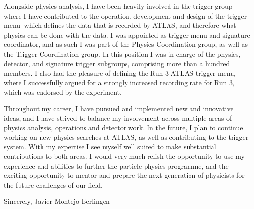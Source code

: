 \documentclass[11pt,a4paper,sans]{moderncv}        %
\begin{document}


Alongside physics analysis, I have been heavily involved in the trigger group where I have contributed to the operation, development and design of the trigger menu, which defines the data that is recorded by ATLAS, and therefore what physics can be done with the data. I was appointed as trigger menu and signature coordinator, and as such I was part of the Physics Coordination group, as well as the Trigger Coordination group. In this position I was in charge of the physics, detector, and signature trigger subgroups, comprising more than a hundred members.
I also had the pleasure of defining the Run 3 ATLAS trigger menu, where I successfully argued for a strongly increased recording rate for Run 3, which was endorsed by the experiment.
\newline

Throughout my career, I have pursued and implemented new and innovative ideas, and I have strived to balance my involvement across multiple areas of physics analysis, operations and detector work. 
In the future, I plan to continue working on new physics searches at ATLAS, as well as contributing to the trigger system. 
With my expertise I see myself well suited to make substantial contributions to both areas.
I would very much relish the opportunity to use my experience and abilities to further the particle physics programme, and the exciting opportunity to mentor and prepare the next generation of physicists for the future challenges of our field.
\newline


Sincerely,
\newline
\newline
\newline
Javier Montejo Berlingen
\end{document}
